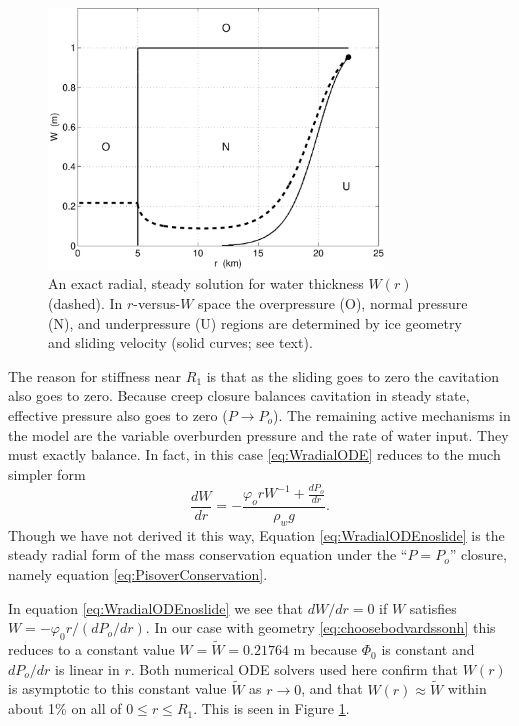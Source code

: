 \documentclass[11pt,final]{amsart}
\begin{document}
\begin{figure}[ht]
\includegraphics[width=3.5in,keepaspectratio=true]{exact-W-plot-onu}
\caption{An exact radial, steady solution for water thickness $W(r)$ (dashed).  In $r$-versus-$W$ space the overpressure (O), normal pressure (N), and underpressure (U) regions are determined by ice geometry and sliding velocity (solid curves; see text).}
\label{fig:Wexact}
\end{figure}

The reason for stiffness near $R_1$ is that as the sliding goes to zero the cavitation also goes to zero.  Because creep closure balances cavitation in steady state, effective pressure also goes to zero ($P\to P_o$).  The remaining active mechanisms in the model are the variable overburden pressure and the rate of water input.  They must exactly balance.  In fact, in this case \eqref{eq:WradialODE} reduces to the much simpler form
\begin{equation}
\frac{dW}{dr} = - \frac{\varphi_o r W^{-1} + \frac{dP_o}{dr}}{\rho_w g}. \label{eq:WradialODEnoslide}
\end{equation}
Though we have not derived it this way, Equation \eqref{eq:WradialODEnoslide} is the steady radial form of the mass conservation equation under the ``$P=P_o$'' closure, namely equation \eqref{eq:PisoverConservation}.

In equation \eqref{eq:WradialODEnoslide} we see that $dW/dr=0$ if $W$ satisfies $W = - \varphi_0 r / (dP_o/dr)$.  In our case with geometry \eqref{eq:choosebodvardssonh} this reduces to a constant value $W=\tilde W= 0.21764$ m because $\Phi_0$ is constant and $dP_o/dr$ is linear in $r$.  Both numerical ODE solvers used here confirm that $W(r)$ is asymptotic to this constant value $\tilde W$ as $r\to 0$, and that $W(r)\approx \tilde W$ within about 1\% on all of $0\le r \le R_1$.  This is seen in Figure \ref{fig:Wexact}.
\end{document}
